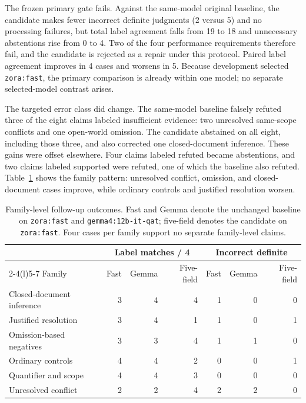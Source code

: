 The frozen primary gate fails. Against the same-model original baseline, the candidate makes fewer incorrect definite judgments (2 versus 5) and no processing failures, but total label agreement falls from 19 to 18 and unnecessary abstentions rise from 0 to 4. Two of the four performance requirements therefore fail, and the candidate is rejected as a repair under this protocol. Paired label agreement improves in 4 cases and worsens in 5. Because development selected \texttt{zora:fast}, the primary comparison is already within one model; no separate selected-model contrast arises.

The targeted error class did change. The same-model baseline falsely refuted three of the eight claims labeled insufficient evidence: two unresolved same-scope conflicts and one open-world omission. The candidate abstained on all eight, including those three, and also corrected one closed-document inference. These gains were offset elsewhere. Four claims labeled refuted became abstentions, and two claims labeled supported were refuted, one of which the baseline also refuted. Table~\ref{tab:followup-families} shows the family pattern: unresolved conflict, omission, and closed-document cases improve, while ordinary controls and justified resolution worsen.

\begin{table}[htbp]
\centering
\begin{tabular}{@{}lrrrrrr@{}}
\toprule
& \multicolumn{3}{c}{Label matches / 4} & \multicolumn{3}{c}{Incorrect definite}\\\cmidrule(lr){2-4}\cmidrule(l){5-7}
Family & Fast & Gemma & Five-field & Fast & Gemma & Five-field\\\midrule
Closed-document inference & 3 & 4 & 4 & 1 & 0 & 0\\
Justified resolution & 3 & 4 & 1 & 1 & 0 & 1\\
Omission-based negatives & 3 & 3 & 4 & 1 & 1 & 0\\
Ordinary controls & 4 & 4 & 2 & 0 & 0 & 1\\
Quantifier and scope & 4 & 4 & 3 & 0 & 0 & 0\\
Unresolved conflict & 2 & 2 & 4 & 2 & 2 & 0\\
\bottomrule
\end{tabular}
\caption{Family-level follow-up outcomes. Fast and Gemma denote the unchanged baseline on \texttt{zora:fast} and \texttt{gemma4:12b-it-qat}; five-field denotes the candidate on \texttt{zora:fast}. Four cases per family support no separate family-level claims.}
\label{tab:followup-families}
\end{table}

